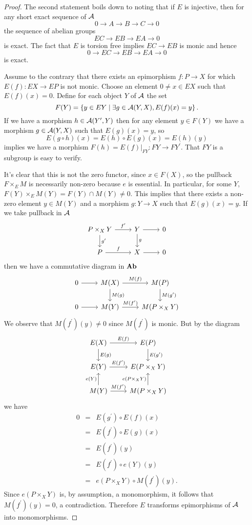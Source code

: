 \documentclass[reqno, 12pt]{amsart}
\begin{document}
\begin{proof}
  The second statement boils down to noting that if $E$ is injective, then for any short exact sequence of $\mathcal{A}$
  $$0 \to A \to B \to C \to 0$$
  the sequence of abelian groups
  $$EC \to EB \to EA \to 0$$
  is exact.
  The fact that $E$ is torsion free implies $EC \to EB$ is monic and hence
  $$0 \to EC \to EB \to EA \to 0$$
  is exact.
  
  Assume to the contrary that there exists an epimorphism $f \colon P \to X$ for which $E(f) \colon EX \to EP$ is not monic.
  Choose an element $0 \neq x \in EX$ such that $E(f)(x) = 0$.
  Define for each object $Y$ of $\mathcal{A}$ the set
  $$F(Y) = \left\{y \in EY \;\middle\vert\; \exists g \in \mathcal{A}(Y,X), E(f)(x) = y\right\}.$$
  If we have a morphism $h \in \mathcal{A}(Y^\prime, Y)$ then for any element $y \in F(Y)$ we have a morphism $g \in \mathcal{A}(Y,X)$ such that $E(g)(x) = y$, so
  $$E(g \circ h)(x) = E(h) \circ E(g)(x) = E(h)(y)$$
  implies we have a morphism $F(h) = E(f)|_{FY} \colon FY \to FY^\prime$.
  That $FY$ is a subgroup is easy to verify.

  It's clear that this is not the zero functor, since $x \in F(X)$, so the pullback $F \times_E M$ is necessarily non-zero because $e$ is essential.
  In particular, for some $Y$, $F(Y) \times_E M(Y) = F(Y) \cap M(Y) \neq 0$.
  This implies that there exists a non-zero element $y \in M(Y)$ and a morphism $g \colon Y \to X$ such that $E(g)(x) = y$.
  If we take pullback in $\mathcal{A}$
  $$\begin{tikzcd}
    P \times_X Y \arrow{d}{g^\prime}\arrow{r}{f^\prime} & Y\arrow{d}{g} \arrow{r} & 0\\
    P \arrow{r}{f} & X \arrow{r} & 0
  \end{tikzcd}$$
  then we have a commutative diagram in $\operatorname{\bf Ab}$
  $$\begin{tikzcd}
    0 \arrow{r} & M(X) \arrow{r}{M(f)}\arrow{d}{M(g)} & M(P)\arrow{d}{M(g^\prime)}\\
    0 \arrow{r} & M(Y) \arrow{r}{M(f^\prime)} & M(P \times_X Y)
  \end{tikzcd}$$
  We observe that $M(f^\prime)(y) \neq 0$ since $M(f^\prime)$ is monic.
  But by the diagram
  $$\begin{tikzcd}
    E(X) \arrow{r}{E(f)}\arrow{d}{E(g)} & E(P)\arrow{d}{E(g^\prime)}\\
    E(Y) \arrow{r}{E(f^\prime)} & E(P \times_X Y)\\
    M(Y)\arrow{u}{e(Y)}\arrow{r}{M(f^\prime)} & M(P \times_X Y)\arrow{u}{e(P \times_XY)}
  \end{tikzcd}$$
  we have
  \begin{eqnarray*}
    0 
    &=& E(g^\prime) \circ E(f)(x)\\
    &=& E(f^\prime) \circ E(g)(x)\\
    &=& E(f^\prime)(y)\\
    &=& E(f^\prime) \circ e(Y)(y)\\
    &=& e(P \times_X Y) \circ M(f^\prime)(y).
  \end{eqnarray*}
  Since $e(P \times_X Y)$ is, by assumption, a monomorphism, it follows that $M(f^\prime)(y) = 0$, a contradiction.
  Therefore $E$ transforms epimorphisms of $\mathcal{A}$ into monomorphisms.
\end{proof}
\end{document}
